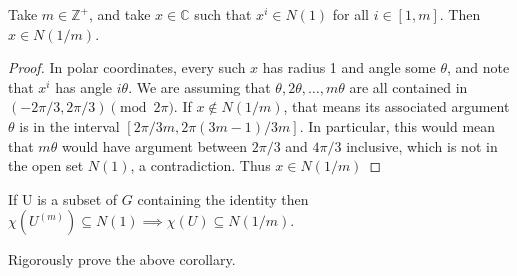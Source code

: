 \documentclass[11pt, x11names, openany]{book}
\newcommand{\zz}{\mathbb{Z}}
\newcommand{\cc}{\mathbb{C}}
\begin{document}
\begin{lemma}
\label{compact-open key lemma}
Take $m \in \zz^+$, and take $x \in \cc$ such that $x^i \in N(1)$ for all $i \in [1, m]$.
Then $x \in N(1/m)$.
\end{lemma}
\begin{proof}
In polar coordinates, every such $x$ has radius 1 and angle some $\theta$, and note that $x^i$
has angle $i \theta$. We are assuming that $\theta, 2 \theta, \ldots, m\theta$ are all 
contained in $(-2\pi/3, 2\pi/3) \pmod{2\pi}$. If $x \notin N(1/m)$, that means its associated
argument $\theta$ is in the interval $[2\pi/3m, 2\pi (3m - 1)/3m]$. In particular, this would mean that $m \theta$ would have argument between $2 \pi / 3$ and $4\pi/3$ inclusive, which is not in the open set $N(1)$, a contradiction. Thus $x \in N(1/m)$
\end{proof}
\begin{corollary}
\label{compact-open key corollary}
    If U is a subset of $G$ containing the identity then $\chi(U^{(m)}) \subseteq N(1) \implies \chi(U) \subseteq N(1/m)$. 
\end{corollary}

\begin{exercise}
Rigorously prove the above corollary.
\end{exercise}
\end{document}
